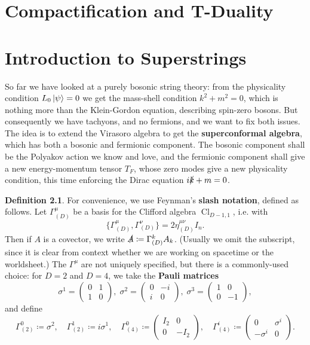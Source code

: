 \documentclass{report}
\theoremstyle{plain}
\theoremstyle{definition}
\newtheorem{definition}[theorem]{Definition}
\theoremstyle{remark}
\DeclareMathOperator{\Cl}{Cl}
\begin{document}
\chapter{Compactification and T-Duality}



\chapter{Introduction to Superstrings}

So far we have looked at a purely bosonic string theory: from the
physicality condition $L_0\ket{\psi} = 0$ we get the mass-shell
condition $k^2 + m^2 = 0$, which is nothing more than the Klein-Gordon
equation, describing spin-zero bosons. But consequently we have
tachyons, and no fermions, and we want to fix both issues. The idea is
to extend the Virasoro algebra to get the {\bf superconformal
  algebra}, which has both a bosonic and fermionic component. The
bosonic component shall be the Polyakov action we know and love, and
the fermionic component shall give a new energy-momentum tensor $T_F$,
whose zero modes give a new physicality condition, this time enforcing
the Dirac equation $i\slashed{k} + m = 0$.

\begin{definition}
  For convenience, we use Feynman's {\bf slash notation}, defined as
  follows. Let $\Gamma^\mu_{(D)}$ be a basis for the Clifford algebra
  $\Cl_{D-1,1}$, i.e. with
  \[ \{\Gamma^\mu_{(D)}, \Gamma^\nu_{(D)}\} = 2\eta_{(D)}^{\mu\nu}I_n. \]
  Then if $A$ is a covector, we write $\slashed{A} \coloneqq
  \Gamma^k_{(D)} A_k$. (Usually we omit the subscript, since it is
  clear from context whether we are working on spacetime or the
  worldsheet.) The $\Gamma^\mu$ are not uniquely specified, but there
  is a commonly-used choice: for $D = 2$ and $D = 4$, we take the {\bf
    Pauli matrices}
  \[ \sigma^1 = \begin{pmatrix} 0 & 1 \\ 1 & 0 \end{pmatrix}, \; \sigma^2 = \begin{pmatrix} 0 & -i \\ i & 0 \end{pmatrix}, \; \sigma^3 = \begin{pmatrix} 1 & 0 \\ 0 & -1 \end{pmatrix}, \]
  and define
  \[ \Gamma^0_{(2)} \coloneqq \sigma^2, \quad \Gamma^1_{(2)} \coloneqq i\sigma^1, \quad \Gamma^0_{(4)} \coloneqq \begin{pmatrix} I_2 & 0 \\ 0 & -I_2 \end{pmatrix}, \quad \Gamma^i_{(4)} \coloneqq \begin{pmatrix} 0 & \sigma^i \\ -\sigma^i & 0 \end{pmatrix}. \]
\end{definition}
\end{document}
